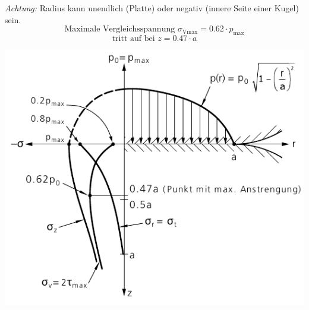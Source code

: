 			\emph{Achtung:} Radius kann unendlich (Platte) oder negativ (innere Seite einer Kugel) sein.
			\begin{equation*}
				\text{Maximale Vergleichsspannung } \sigma_\text{Vmax} = 0.62 \cdot p_\text{max}
			\end{equation*}
			\begin{equation*}
				\text{tritt auf bei } z = 0.47 \cdot a
			\end{equation*}
			
			\begin{center}
				\includegraphics[width=.75\columnwidth]{graphics/kugelgraph}
			\end{center}
